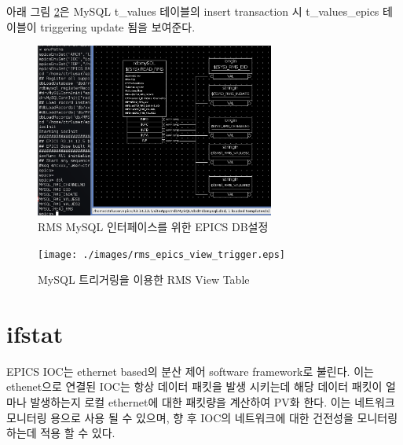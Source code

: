 \documentclass[11pt
  , a4paper
  , article
  , oneside
]{memoir}
\begin{document}
아래 그림 \ref{fig:rms_epics_view_trigger}은 MySQL t\_values 테이블의 insert transaction 시 t\_values\_epics 테이블이 triggering update 됨을 보여준다.

\clearpage

\begin{figure}[h!]
	\centering
	\includegraphics[width=0.7\textwidth]{./images/rms_epics_db.eps}
	\caption{RMS MySQL 인터페이스를 위한 EPICS DB설정}
	\label{fig:rms_epics_db}
\end{figure}

\begin{figure}[h!]
	\centering
	\texttt{[image: ./images/rms\_epics\_view\_trigger.eps]}
	\caption{MySQL 트리거링을 이용한 RMS View Table}
	\label{fig:rms_epics_view_trigger}
\end{figure}

\clearpage

\chapter{ifstat}
EPICS IOC는 ethernet based의 분산 제어 software framework로 불린다. 이는 ethenet으로 연결된 IOC는 항상 데이터 패킷을 발생 시키는데 해당 데이터 패킷이 얼마나 발생하는지 로컬 ethernet에 대한 패킷량을 계산하여 PV화 한다. 이는 네트워크 모니터링 용으로 사용 될 수 있으며, 향 후 IOC의 네트워크에 대한 건전성을 모니터링하는데 적용 할 수 있다.



\clearpage


\end{document}
